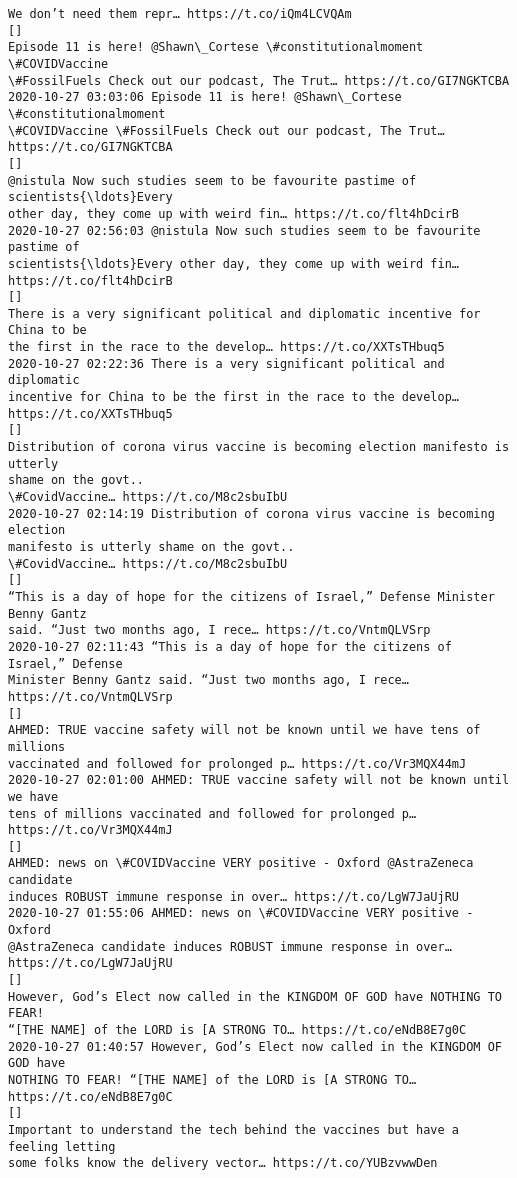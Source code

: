 \documentclass[11pt]{article}
\begin{document}
\begin{Verbatim}[commandchars=\\\{\}]
We don’t need them repr… https://t.co/iQm4LCVQAm
[]
Episode 11 is here! @Shawn\_Cortese \#constitutionalmoment \#COVIDVaccine
\#FossilFuels Check out our podcast, The Trut… https://t.co/GI7NGKTCBA
2020-10-27 03:03:06 Episode 11 is here! @Shawn\_Cortese \#constitutionalmoment
\#COVIDVaccine \#FossilFuels Check out our podcast, The Trut…
https://t.co/GI7NGKTCBA
[]
@nistula Now such studies seem to be favourite pastime of scientists{\ldots}Every
other day, they come up with weird fin… https://t.co/flt4hDcirB
2020-10-27 02:56:03 @nistula Now such studies seem to be favourite pastime of
scientists{\ldots}Every other day, they come up with weird fin…
https://t.co/flt4hDcirB
[]
There is a very significant political and diplomatic incentive for China to be
the first in the race to the develop… https://t.co/XXTsTHbuq5
2020-10-27 02:22:36 There is a very significant political and diplomatic
incentive for China to be the first in the race to the develop…
https://t.co/XXTsTHbuq5
[]
Distribution of corona virus vaccine is becoming election manifesto is utterly
shame on the govt..
\#CovidVaccine… https://t.co/M8c2sbuIbU
2020-10-27 02:14:19 Distribution of corona virus vaccine is becoming election
manifesto is utterly shame on the govt..
\#CovidVaccine… https://t.co/M8c2sbuIbU
[]
“This is a day of hope for the citizens of Israel,” Defense Minister Benny Gantz
said. “Just two months ago, I rece… https://t.co/VntmQLVSrp
2020-10-27 02:11:43 “This is a day of hope for the citizens of Israel,” Defense
Minister Benny Gantz said. “Just two months ago, I rece… https://t.co/VntmQLVSrp
[]
AHMED: TRUE vaccine safety will not be known until we have tens of millions
vaccinated and followed for prolonged p… https://t.co/Vr3MQX44mJ
2020-10-27 02:01:00 AHMED: TRUE vaccine safety will not be known until we have
tens of millions vaccinated and followed for prolonged p…
https://t.co/Vr3MQX44mJ
[]
AHMED: news on \#COVIDVaccine VERY positive - Oxford ⁦@AstraZeneca⁩ candidate
induces ROBUST immune response in over… https://t.co/LgW7JaUjRU
2020-10-27 01:55:06 AHMED: news on \#COVIDVaccine VERY positive - Oxford
⁦@AstraZeneca⁩ candidate induces ROBUST immune response in over…
https://t.co/LgW7JaUjRU
[]
However, God’s Elect now called in the KINGDOM OF GOD have NOTHING TO FEAR!
“[THE NAME] of the LORD is [A STRONG TO… https://t.co/eNdB8E7g0C
2020-10-27 01:40:57 However, God’s Elect now called in the KINGDOM OF GOD have
NOTHING TO FEAR! “[THE NAME] of the LORD is [A STRONG TO…
https://t.co/eNdB8E7g0C
[]
Important to understand the tech behind the vaccines but have a feeling letting
some folks know the delivery vector… https://t.co/YUBzvwwDen

\end{Verbatim}
\end{document}
